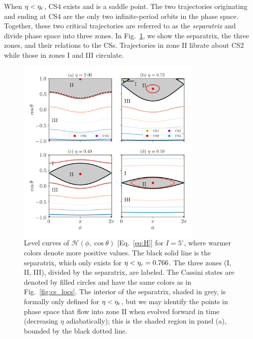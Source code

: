 \documentclass[twocolumn,twocolappendix]{aastex63}
\newcommand*{\p}[1]{\left(#1\right)}
\begin{document}
When $\eta < \eta_{\rm c}$, CS4 exists and is a saddle point. The two
trajectories originating and ending at CS4 are the only two infinite-period
orbits in the phase space. Together, these two critical trajectories are
referred to as the \emph{separatrix} and divide phase space into three zones. In
Fig.~\ref{fig:eq_1contours}, we show the separatrix, the three zones, and their
relations to the CSs. Trajectories in zone II librate about CS2 while those in
zones I and III circulate.
\begin{figure}
    \centering
    \includegraphics[width=0.8\textwidth]{plots_diskdisp/1contours_flip.png}
    \caption{Level curves of $\mathcal{H}\p{\phi, \cos \theta}$
    [Eq.~\eqref{eq:H}] for $I = 5^\circ$, where warmer colors
    denote more positive values. The black solid line is the separatrix, which
    only exists for $\eta < \eta_{\rm c} = 0.766$. The three zones (I, II, III),
    divided by the separatrix, are labeled. The Cassini states are denoted by
    filled circles and have the same colors as in Fig.~\ref{fig:cs_locs}. The
    interior of the separatrix, shaded in grey, is formally only defined for
    $\eta < \eta_{\rm c}$, but we may identify the points in phase space that
    flow into zone II when evolved forward in time (decreasing $\eta$
    adiabatically); this is the shaded region in panel (a), bounded by the black
    dotted line.}\label{fig:eq_1contours}
\end{figure}
\end{document}
